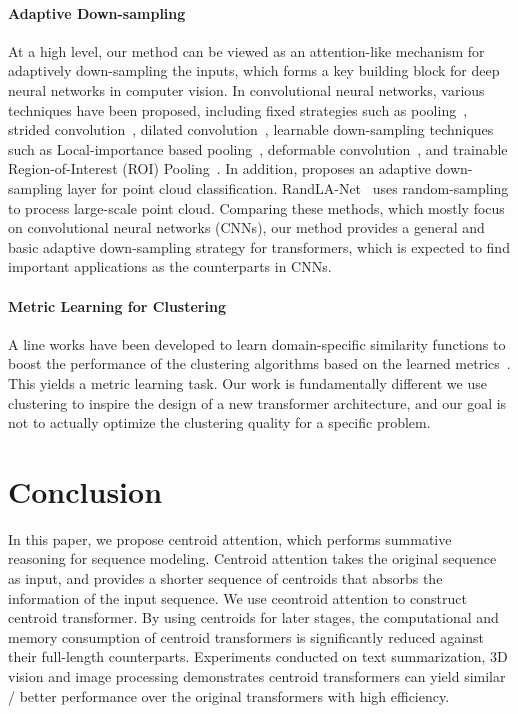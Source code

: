 \documentclass[english]{article}
\begin{document}
\paragraph{Adaptive Down-sampling}
At a high level, our method can be viewed as an attention-like mechanism for adaptively  down-sampling the inputs,
which forms a key building block for deep neural networks in computer vision.
In convolutional neural networks,
various techniques have been proposed, including fixed strategies such as
pooling~\citep{simonyan2014very},
strided convolution~\citep{springenberg2014striving}, dilated convolution~\citep{yu2015multi},
learnable down-sampling techniques such as  Local-importance based pooling~\citep{gao2019lip}, deformable convolution~\citep{dai2017deformable}, and trainable Region-of-Interest (ROI) Pooling~\citep{gu2018learning}.
In addition,
\citet{nezhadarya2020adaptive} proposes an adaptive down-sampling layer for point cloud classification. RandLA-Net~\citep{hu2020randla} uses random-sampling to process large-scale point cloud.
Comparing these methods,
which mostly focus on convolutional neural networks (CNNs), our method provides a general and basic adaptive down-sampling strategy for transformers, which is expected to find important applications as the counterparts in CNNs.


\paragraph{Metric Learning for Clustering}
A line works have been developed to
learn domain-specific similarity functions to boost
the performance of the clustering algorithms based on the learned metrics~\citep{yang2016joint, yang2017towards, Hsu18_L2C, aljalbout2018clustering, yang2019learning}.
This yields a metric learning task.
Our work is fundamentally different
we use clustering to inspire the design of a new transformer architecture, and our goal is not to actually optimize the clustering quality for a specific problem.


\section{Conclusion}
In this paper, we propose centroid attention, which performs summative reasoning for sequence modeling. Centroid attention takes the original sequence as input, and provides a shorter sequence of centroids that absorbs the information of the input sequence. We use ceontroid attention to construct centroid transformer. By using centroids for later stages, the computational and memory consumption of centroid transformers is significantly reduced against their full-length counterparts. Experiments conducted on text summarization, 3D vision and image processing demonstrates centroid transformers can yield similar / better performance over the original transformers with high efficiency.
 
\end{document}
